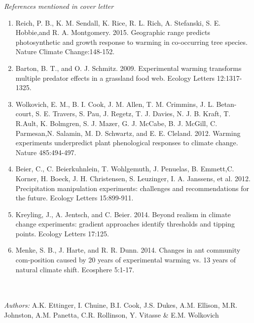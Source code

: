 \documentclass[11pt,a4paper]{letter}
\begin{document}
\begin{letter}{}
\noindent \emph{References mentioned in cover letter}
\begin{footnotesize}
\begin{enumerate}
\item Reich,  P. B.,  K. M. Sendall,  K. Rice,  R. L. Rich,  A. Stefanski,  S. E. Hobbie,and R. A. Montgomery. 2015.  Geographic range predicts photosynthetic and growth response to warming in co-occurring tree species. Nature Climate Change:148-152.
\item Barton,  B.  T.,  and  O.  J.  Schmitz.  2009.   Experimental  warming  transforms multiple predator effects in a grassland food web.  Ecology Letters 12:1317-1325.
\item Wolkovich,  E.  M.,  B.  I.  Cook,  J.  M.  Allen,  T.  M.  Crimmins,  J.  L.  Betan-court, S. E. Travers, S. Pau, J. Regetz, T. J. Davies, N. J. B. Kraft, T. R.Ault, K. Bolmgren, S. J. Mazer, G. J. McCabe, B. J. McGill, C. Parmesan,N. Salamin, M. D. Schwartz, and E. E. Cleland. 2012.  Warming experiments underpredict plant phenological responses to climate change. Nature 485:494-497.
\item Beier,   C.,   C.   Beierkuhnlein,   T.   Wohlgemuth,   J.   Penuelas,   B.   Emmett,C. Korner, H. Boeck, J. H. Christensen, S. Leuzinger, I. A. Janssens, et al. 2012.  Precipitation manipulation experiments: challenges and recommendations for the future.  Ecology Letters 15:899-911.
\item Kreyling, J., A. Jentsch, and C. Beier. 2014.  Beyond realism in climate change experiments: gradient  approaches  identify  thresholds  and  tipping  points. Ecology Letters 17:125.
\item Menke, S. B., J. Harte, and R. R. Dunn. 2014. Changes in ant community com-position caused by 20 years of experimental warming vs. 13 years of natural climate shift.  Ecosphere 5:1-17.

\end{enumerate}
\end{footnotesize}


\newpage
{}\\
\\
\noindent \emph{Authors:} A.K. Ettinger, I. Chuine, B.I. Cook, J.S. Dukes, A.M. Ellison, M.R. Johnston, A.M. Panetta, C.R. Rollinson, Y. Vitasse \& E.M. Wolkovich
\\


\end{letter}
\end{document}
